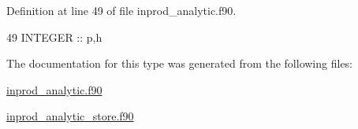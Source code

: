 Definition at line 49 of file inprod\+\_\+analytic.\+f90.


\begin{DoxyCode}
49      \textcolor{keywordtype}{INTEGER} :: p,h
\end{DoxyCode}


The documentation for this type was generated from the following files\+:\begin{DoxyCompactItemize}
\item 
\hyperlink{inprod__analytic_8f90}{inprod\+\_\+analytic.\+f90}\item 
\hyperlink{inprod__analytic__store_8f90}{inprod\+\_\+analytic\+\_\+store.\+f90}\end{DoxyCompactItemize}
